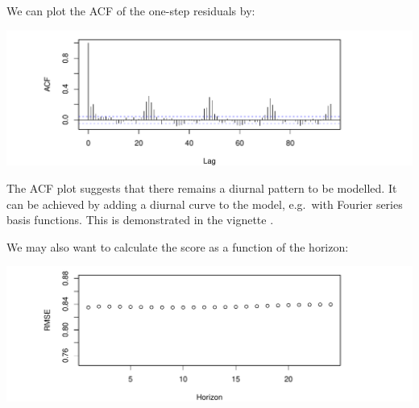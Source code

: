\noindent We can plot the ACF of the one-step residuals by:
\begin{knitrout}
\color{fgcolor}\begin{kframe}
\begin{alltt}
\hlstd{(}\hlopt{\$}  \hlstd{=}\hlstd{,} \hlstd{=}\hlstd{)}
\end{alltt}
\end{kframe}
\includegraphics[width=1\linewidth]{tmp/genfig/unnamed-chunk-32-1} 
\end{knitrout}

\noindent The ACF plot suggests that there remains a diurnal pattern to be modelled. It can
be achieved by adding a diurnal curve to the model, e.g.\ with Fourier series
basis functions. This is demonstrated in the vignette .

\noindent We may also want to calculate the score as a function of the horizon:
\begin{knitrout}
\color{fgcolor}\begin{kframe}
\begin{alltt}
 \hlkwb{<-} \hlopt{\$} \hlopt{&} \hlopt{\$}
 \hlkwb{<-} \hlstd{(}  
 \hlstd{=}\hlstd{(}\hlstd{,}\hlstd{),} \hlstd{=}\hlstd{)}
\end{alltt}
\end{kframe}
\includegraphics[width=1\linewidth]{tmp/genfig/unnamed-chunk-33-1} 
\end{knitrout}

